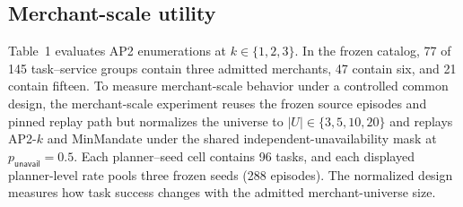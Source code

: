 \documentclass[letterpaper]{article}
\begin{document}
\subsection{Merchant-scale utility}
\label{app:merchant-universe-extension}

Table~1 evaluates AP2 enumerations at \(k\in\{1,2,3\}\). In the frozen catalog,
77 of 145
task--service groups contain three admitted merchants, 47 contain six, and 21
contain fifteen. To measure merchant-scale behavior under a controlled common
design, the merchant-scale experiment reuses the
frozen source episodes and pinned replay path but normalizes the universe to
\(\lvert U\rvert\in\{3,5,10,20\}\) and replays AP2-\(k\) and MinMandate under
the shared independent-unavailability mask at
\(p_{\mathsf{unavail}}=0.5\). Each planner--seed cell contains 96 tasks, and
each displayed planner-level rate pools three frozen seeds (288 episodes).
The normalized design measures how task success changes with the admitted
merchant-universe size.
\end{document}
